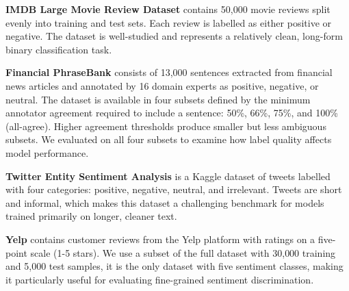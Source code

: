 \documentclass[conference]{IEEEtran}
\begin{document}
\begin{table}[H]
\centering
\footnotesize
\caption{Overview of datasets used in experiments.}
\label{tab:datasets}
\end{table}

\textbf{IMDB Large Movie Review Dataset} \cite{maas2011imdb} contains 50{,}000 movie reviews split evenly into training and test sets. Each review is labelled as either positive or negative. The dataset is well-studied and represents a relatively clean, long-form binary classification task.

\textbf{Financial PhraseBank} \cite{malo2014phrasebank} consists of 13{,}000 sentences extracted from financial news articles and annotated by 16 domain experts as positive, negative, or neutral. The dataset is available in four subsets defined by the minimum annotator agreement required to include a sentence: 50\%, 66\%, 75\%, and 100\% (all-agree). Higher agreement thresholds produce smaller but less ambiguous subsets. We evaluated on all four subsets to examine how label quality affects model performance.

\textbf{Twitter Entity Sentiment Analysis} \cite{twitter_kaggle} is a Kaggle dataset of tweets labelled with four categories: positive, negative, neutral, and irrelevant. Tweets are short and informal, which makes this dataset a challenging benchmark for models trained primarily on longer, cleaner text.

\textbf{Yelp} \cite{zhang2015character} contains customer reviews from the Yelp platform with ratings on a five-point scale (1-5 stars). We use a subset of the full dataset with 30{,}000 training and 5{,}000 test samples, it is the only dataset with five sentiment classes, making it particularly useful for evaluating fine-grained sentiment discrimination.
\end{document}
